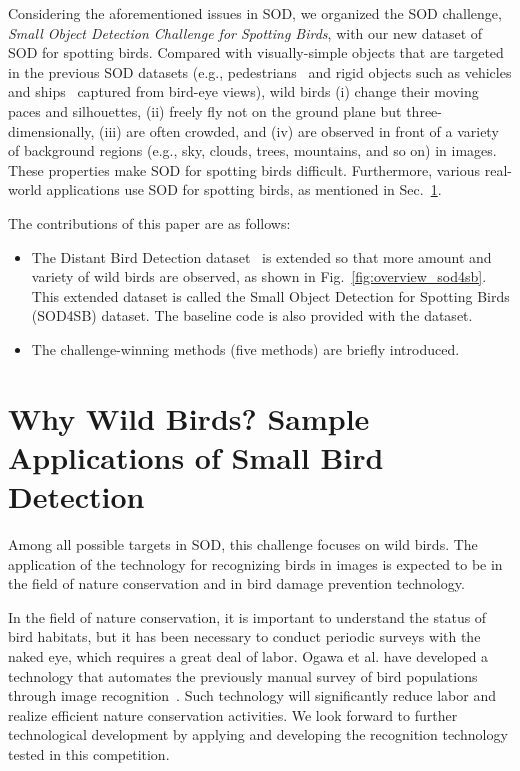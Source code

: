 \documentclass{mva_style}
\begin{document}
Considering the aforementioned issues in SOD, we organized the SOD challenge, {\em Small Object Detection Challenge for Spotting Birds}, with our new dataset of SOD for spotting birds.
Compared with visually-simple objects that are targeted in the previous SOD datasets (e.g., pedestrians~\cite{yu2020scale,zhang2019widerperson} and rigid objects such as vehicles and ships~\cite{waqas2019isaid,behrendt2017deep,wang2021tiny,coluccia2021drone} captured from bird-eye views), wild birds (i) change their moving paces and silhouettes, (ii) freely fly not on the ground plane but three-dimensionally, (iii) are often crowded, and (iv) are observed in front of a variety of background regions (e.g., sky, clouds, trees, mountains, and so on) in images.
These properties make SOD for spotting birds difficult.
Furthermore, various real-world applications use SOD for spotting birds, as mentioned in Sec.~\ref{section:applications}.

The contributions of this paper are as follows:
\begin{itemize}
      \item The Distant Bird Detection dataset~\cite{fujii2021distant} is extended so that more amount and variety of wild birds are observed, as shown in Fig.~\ref{fig:overview_sod4sb}.
      This extended dataset is called the Small Object Detection for Spotting Birds (SOD4SB) dataset.
      The baseline code is also provided with the dataset.
      \item The challenge-winning methods (five methods) are briefly introduced.
\end{itemize}



\section{Why Wild Birds? Sample Applications of Small Bird Detection}
\label{section:applications}

Among all possible targets in SOD, this challenge focuses on wild birds.
The application of the technology for recognizing birds in images is expected to be in the field of nature conservation and in bird damage prevention technology.

In the field of nature conservation, it is important to understand the status of bird habitats, but it has been necessary to conduct periodic surveys with the naked eye, which requires a great deal of labor. Ogawa et al. have developed a technology that automates the previously manual survey of bird populations through image recognition~\cite{DBLP:conf/igarss/OgawaLTHKM21}. Such technology will significantly reduce labor and realize efficient nature conservation activities. We look forward to further technological development by applying and developing the recognition technology tested in this competition.
\end{document}

